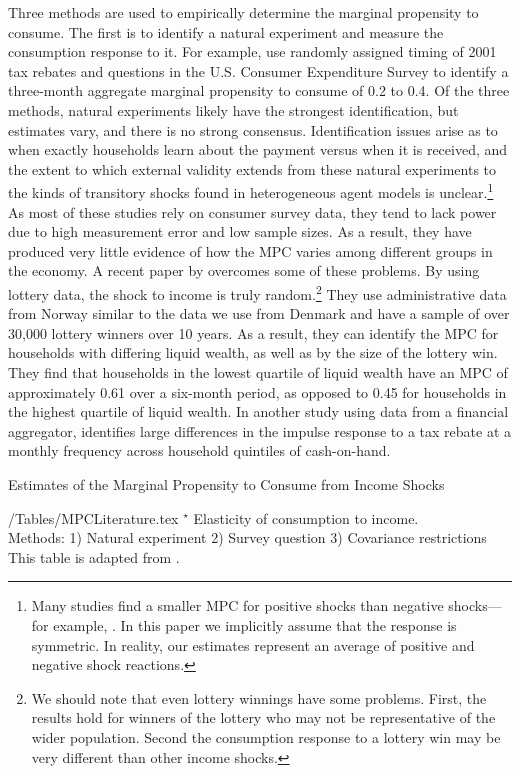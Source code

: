 \documentclass[titlepage]{\econtex}\newcommand{\texname}{ConsumptionHeterogeneity}
\begin{document}
	Three methods are used to empirically determine the marginal propensity to consume. The first is to identify a natural experiment and measure the consumption response to it. For example, \cite{johnson_household_2006} use randomly assigned timing of 2001 tax rebates and questions in the U.S. Consumer Expenditure Survey to identify a three-month aggregate marginal propensity to consume of 0.2 to 0.4. Of the three methods, natural experiments likely have the strongest identification, but estimates vary, and there is no strong consensus. Identification issues arise as to when exactly households learn about the payment versus when it is received, and the extent to which external validity extends from these natural experiments to the kinds of transitory shocks found in heterogeneous agent models is unclear.\footnote{Many studies find a smaller MPC for positive shocks than negative shocks---for example, \cite{bunn_consumption_2018}. In this paper we implicitly assume that the response is symmetric. In reality, our estimates represent an average of positive and negative shock reactions.} As most of these studies rely on consumer survey data, they tend to lack power due to high measurement error and low sample sizes. As a result, they have produced very little evidence of how the MPC varies among different groups in the economy. A recent paper by \cite{fagereng_mpc_2016} overcomes some of these problems. By using lottery data, the shock to income is truly random.\footnote{We should note that even lottery winnings have some problems. First, the results hold for winners of the lottery who may not be representative of the wider population. Second the consumption response to a lottery win may be very different than other income shocks.} They use administrative data from Norway similar to the data we use from Denmark and have a sample of over 30,000 lottery winners over 10 years. As a result, they can identify the MPC for households with differing liquid wealth, as well as by the size of the lottery win. They find that households in the lowest quartile of liquid wealth have an MPC of approximately 0.61 over a six-month period, as opposed to 0.45 for households in the highest quartile of liquid wealth. In another study using data from a financial aggregator, \cite{gelman_what_2016} identifies large differences in the impulse response to a tax rebate at a monthly frequency across household quintiles of cash-on-hand.
	\begin{sidewaystable} \small
		\caption{Estimates of the Marginal Propensity to Consume from Income Shocks}
		\label{table:MPCLiterature}
		\begin{minipage}{\textwidth}
			\econtexRoot/Tables/MPCLiterature.tex 
			\footnotesize{$^{\star}$ Elasticity of consumption to income. \\
				Methods: 1) Natural experiment 2) Survey question 3) Covariance restrictions \\
				This table is adapted from \cite{carroll_distribution_2017}.}
		\end{minipage}
	\end{sidewaystable}
	
\end{document}

